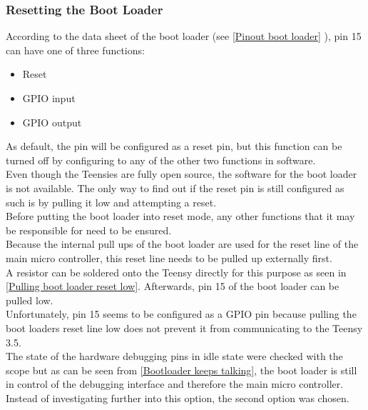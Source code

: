 \subsubsection{Resetting the Boot Loader} \label{Resetting the Boot Loader}
According to the data sheet of the boot loader (see \autoref{Pinout boot loader} ), pin 15 can have one of three functions: \\
\begin{itemize}
    \item Reset
    \item GPIO input
    \item GPIO output
\end{itemize}
As default, the pin will be configured as a reset pin, but this function can be turned off by configuring to any of the other two functions in software. \\
Even though the Teensies are fully open source, the software for the boot loader is not available. The only way to find out if the reset pin is still configured as such is by pulling it low and attempting a reset. \\
Before putting the boot loader into reset mode, any other functions that it may be responsible for need to be ensured. \\
Because the internal pull ups of the boot loader are used for the reset line of the main micro controller, this reset line needs to be pulled up externally first. \\
A resistor can be soldered onto the Teensy directly for this purpose as seen in \autoref{Pulling boot loader reset low}. Afterwards, pin 15 of the boot loader can be pulled low. \\
Unfortunately, pin 15 seems to be configured as a GPIO pin because pulling the boot loaders reset line low does not prevent it from communicating to the Teensy 3.5. \\
The state of the hardware debugging pins in idle state were checked with the scope but as can be seen from \autoref{Bootloader keeps talking}, the boot loader is still in control of the debugging interface and therefore the main micro controller.\\
Instead of investigating further into this option, the second option was chosen. \\
%
